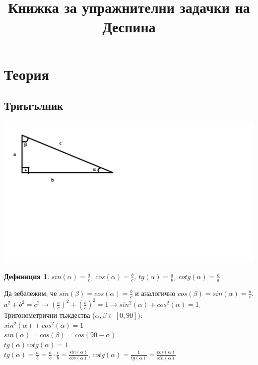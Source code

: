 \documentclass{article}
\date{}
\title{Книжка за упражнителни задачки на Деспина}
\newtheorem{definition}{Дефиниция}
\begin{document}
	
	
	\maketitle
	
	
	\section{Теория}
	
	\subsection{Триъгълник}
	
	\includegraphics{Trig1}
	
	\vspace{-8cm}
	
	\begin{definition}$ sin(\alpha) = \frac{a}{c} $, $ cos(\alpha) = \frac{b}{c} $, $tg(\alpha) = \frac{a}{b} $, $cotg(\alpha) = \frac{b}{a} $	
	\end{definition}
Да зебележим, че $ sin(\beta) = cos(\alpha) = \frac{b}{c} $ и аналогично $cos(\beta) = sin(\alpha ) = \frac{a}{c} $.
$a^2 + b^2 = c^2  \to (\frac{a}{c})^2 + (\frac{b}{c})^2 = 1 \to sin^2(\alpha) + cos^2(\alpha) = 1$. \\
Тригонометрични тъждества ($\alpha, \beta \in [0,90] )$: \\
$sin^2(\alpha) + cos^2(\alpha) = 1$ \\
$ sin(\alpha) = cos(\beta) = cos(90 - \alpha) $ \\
$ tg(\alpha)cotg(\alpha) = 1 $ \\
$ tg(\alpha) = \frac{a}{b} = \frac{a}{c} \cdot \frac{c}{b} = \frac{sin(\alpha)}{cos(\alpha)} $, $cotg(\alpha) = \frac{1}{tg(\alpha)} = \frac{cos(\alpha)}{sin(\alpha)} $ 
\end{document}
